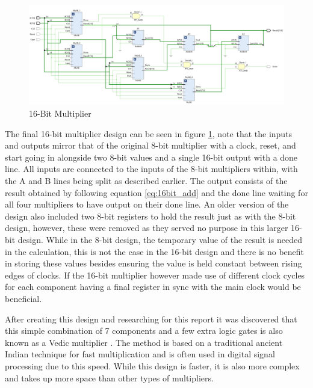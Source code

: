 \documentclass[11pt]{article}
\begin{document}
\begin{figure}[H]         
    \centering
    \includegraphics[width=\textwidth]{16bit.png}
    \caption{16-Bit Multiplier}
    \label{fig:8bit}
\end{figure} 

The final 16-bit multiplier design can be seen in figure \ref{fig:8bit},
note that the inputs and outputs mirror that of the original 8-bit multiplier with a clock, reset, and start going in alongside two 8-bit values and a single 16-bit output with a done line.
All inputs are connected to the inputs of the 8-bit multipliers within, with the A and B lines being split as described earlier. 
The output consists of the result obtained by following equation \ref{eq:16bit_add} and the done line waiting for all four multipliers to have output on their done line.
An older version of the design also included two 8-bit registers to hold the result just as with the 8-bit design, however, these were removed as they served no purpose in this larger 16-bit design.
While in the 8-bit design, the temporary value of the result is needed in the calculation, this is not the case in the 16-bit design and there is no benefit in storing these values besides ensuring the value is held constant between rising edges of clocks.
If the 16-bit multiplier however made use of different clock cycles for each component having a final register in sync with the main clock would be beneficial.

After creating this design and researching for this report it was discovered that this simple combination of 7 components and a few extra logic gates is also known as a Vedic multiplier \cite{vedic}.
The method is based on a traditional ancient Indian technique for fast multiplication and is often used in digital signal processing due to this speed.
While this design is faster, it is also more complex and takes up more space than other types of multipliers.
\end{document}

